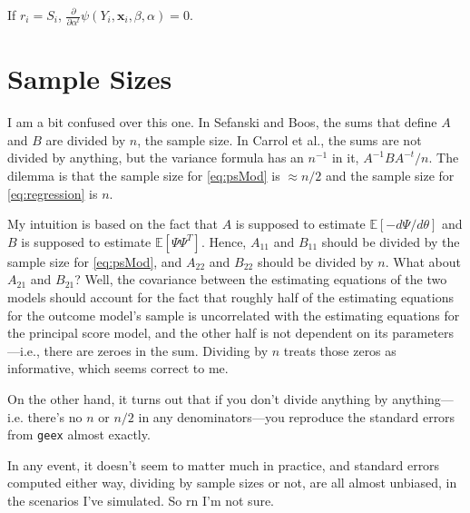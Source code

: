 \documentclass[11pt]{article} %
\begin{document}
If $r_i=S_i$, $\frac{\partial}{\partial \alpha^t}\psi(Y_i,\bm{x}_i,\beta,\alpha)=0$.

\section{Sample Sizes}

I am a bit confused over this one.
In Sefanski and Boos, the sums that define $A$ and $B$ are divided by $n$, the sample size.
In Carrol et al., the sums are not divided by anything, but the variance formula has an $n^{-1}$ in it, $A^{-1}BA^{-t}/n$.
The dilemma is that the sample size for \eqref{eq:psMod} is $\approx n/2$ and the sample size for \eqref{eq:regression} is $n$.

My intuition is based on the fact that $A$ is supposed to estimate $\mathbb{E}[-d\Psi/d\theta]$ and $B$ is supposed to estimate $\mathbb{E}[\Psi\Psi^T]$.
Hence, $A_{11}$ and $B_{11}$ should be divided by the sample size for \eqref{eq:psMod}, and $A_{22}$ and $B_{22}$ should be divided by $n$.
What about $A_{21}$ and $B_{21}$? Well, the covariance between the estimating equations of the two models should account for the fact that roughly half of the estimating equations for the outcome model's sample is uncorrelated with the estimating equations for the principal score model, and the other half is not dependent on its parameters---i.e., there are zeroes in the sum. Dividing by $n$ treats those zeros as informative, which seems correct to me.

On the other hand, it turns out that if you don't divide anything by anything---i.e. there's no $n$ or $n/2$ in any denominators---you reproduce the standard errors from \texttt{geex} almost exactly.

In any event, it doesn't seem to matter much in practice, and standard errors computed either way, dividing by sample sizes or not, are all almost unbiased, in the scenarios I've simulated. So rn I'm not sure.
\end{document}
